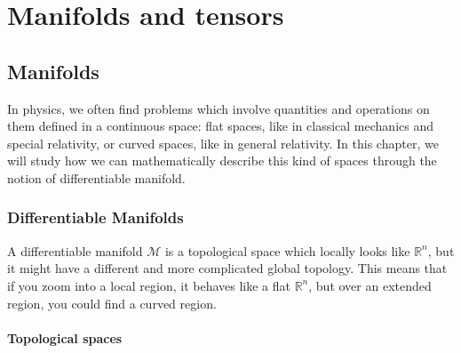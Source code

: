 \part{Manifolds and tensors}

\chapter{Manifolds}

    In physics, we often find problems which involve quantities and operations on them defined in a continuous space: flat spaces, like in classical mechanics and special relativity, or curved spaces, like in general relativity. In this chapter, we will study how we can mathematically describe this kind of spaces through the notion of differentiable manifold.

\section{Differentiable Manifolds}

    A differentiable manifold $\mathcal M$ is a topological space which locally looks like $\mathbb R^n$, but it might have a different and more complicated global topology. This means that if you zoom into a local region, it behaves like a flat $\mathbb R^n$, but over an extended region, you could find a curved region.

\subsection{Topological spaces}


